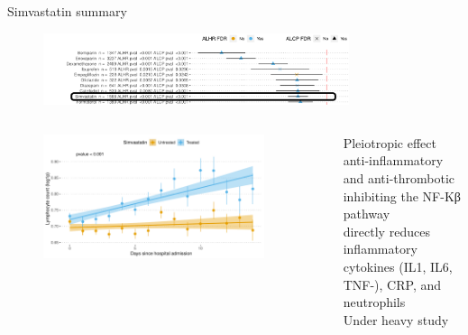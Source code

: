 \documentclass[compress,ignorenonframetext,aspectratio=1610]{beamer}
\begin{document}
\begin{frame}{Simvastatin summary}

	\begin{figure}
		\includegraphics[width=0.8\textwidth]{figs/results/simvastatin_summary_.png}	
	\end{figure}
		
	\begin{columns}
			
		\begin{figure}
			\includegraphics[width=0.9\textwidth]{figs/results/db00641_simvastatin_lymphocite_progression.pdf}	
		\end{figure}

		Pleiotropic effect\\
		anti-inflammatory and anti-thrombotic\\
		inhibiting the NF-Kβ pathway\\
		directly reduces inflammatory cytokines (IL1, IL6, TNF-\textalpha), CRP, and neutrophils\\
		Under heavy study

	\end{columns}

\end{frame}
\end{document}
